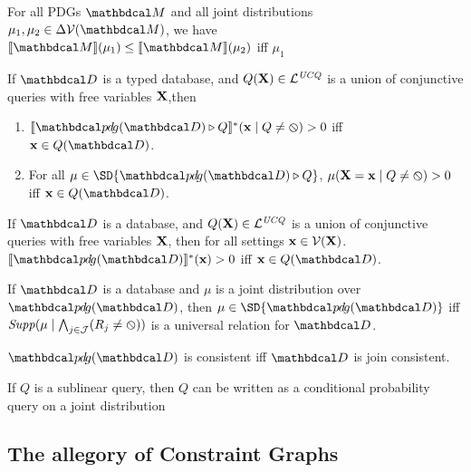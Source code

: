 \documentclass[the-pdg-manual.tex]{subfiles}
\begin{document}
\begin{inactive}
\begin{prop}
  For all PDGs $\dg M$ and all joint distributions $\mu_1, \mu_2 \in \Delta\V(\dg M)$, we have
  $\bbr{\dg M}(\mu_{1}) \le \bbr{\dg M}(\mu_{2})$ iff $\mu_{1}$
\end{prop}
\end{inactive}

\begin{prop}
  If $\D$ is a typed database, and $Q(\mathbf X) \in \mathcal L^{\mathit{UCQ}}$ is a union of conjunctive queries with free variables $\mathbf X$,then
  \begin{enumerate}[label=(\alph*)]
	\item $\bbr{\PDGof{\D} \qq Q}^{*}(\mat x \mid Q \ne \none) > 0$ iff $\mat x \in Q(\D)$.
	\item For all $\mu \in \SD{\PDGof{\D} \qq Q}$, $\mu(\mathbf X = \mathbf x \mid Q \neq\varobslash) > 0$ iff $\mat x \in Q(\D)$.
  \end{enumerate}
\end{prop}


\begin{prop}
    
\end{prop}

\begin{prop}
  If $\D$ is a database, and $Q(\mathbf X) \in \mathcal L^{\mathit{UCQ}}$ is a union of conjunctive queries with free variables $\mathbf X$, then
  for all settings $\mathbf x \in \mathcal V(\mathbf X)$.
  $\bbr{\PDGof{\D}}^{*}(\mat x) > 0$ iff $\mat x \in Q(\D)$.
\end{prop}


\begin{prop}
    If $\D$ is a database and $\mu$ is a joint distribution over $\PDGof{\D}$, then
    $\mu \in \SD{\PDGof{\D}}$ iff $\mathit{Supp}(\mu\mid \bigwedge_{j \in \mathcal J}( R_j \ne \varobslash)) $ is a universal relation for $\D$.
\end{prop}
\begin{coro}
    $\PDGof{\D}$ is consistent iff $\D$ is join consistent.
\end{coro}

\begin{inactive}
\begin{prop}
    If $Q$ is a sublinear query, then $Q$ can be written as a conditional probability query
    on a joint distribution 
\end{prop}
\end{inactive}


\subsection{The allegory of Constraint Graphs}
\end{document}

